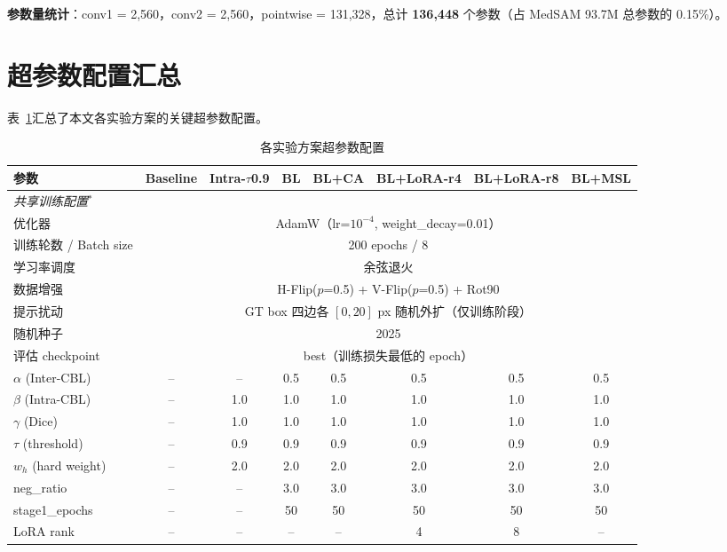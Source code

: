 \textbf{参数量统计}：conv1 = 2,560，conv2 = 2,560，pointwise = 131,328，总计 \textbf{136,448} 个参数（占 MedSAM 93.7M 总参数的 0.15\%）。

\section{超参数配置汇总}

表~\ref{tab:hyperparams}汇总了本文各实验方案的关键超参数配置。

\begin{table}[htbp]
  \centering
  \caption{各实验方案超参数配置}
  \label{tab:hyperparams}
  \footnotesize
  \setlength{\tabcolsep}{2.5pt}
  \begin{tabular}{lccccccc}
    \hline
    参数 & Baseline & Intra-$\tau$0.9 & BL & BL+CA & BL+LoRA-r4 & BL+LoRA-r8 & BL+MSL \\
    \hline
    \multicolumn{8}{l}{\textit{共享训练配置$^*$}} \\
    优化器 & \multicolumn{7}{c}{AdamW（lr=$10^{-4}$, weight\_decay=0.01）} \\
    训练轮数 / Batch size & \multicolumn{7}{c}{200 epochs / 8} \\
    学习率调度 & \multicolumn{7}{c}{余弦退火} \\
    数据增强 & \multicolumn{7}{c}{H-Flip($p$=0.5) + V-Flip($p$=0.5) + Rot90} \\
    提示扰动 & \multicolumn{7}{c}{GT box 四边各 $[0, 20]$ px 随机外扩（仅训练阶段）} \\
    随机种子 & \multicolumn{7}{c}{2025} \\
    评估 checkpoint & \multicolumn{7}{c}{best（训练损失最低的 epoch）} \\
    \hline
    $\alpha$ (Inter-CBL) & -- & -- & 0.5 & 0.5 & 0.5 & 0.5 & 0.5 \\
    $\beta$ (Intra-CBL) & -- & 1.0 & 1.0 & 1.0 & 1.0 & 1.0 & 1.0 \\
    $\gamma$ (Dice) & -- & 1.0 & 1.0 & 1.0 & 1.0 & 1.0 & 1.0 \\
    $\tau$ (threshold) & -- & 0.9 & 0.9 & 0.9 & 0.9 & 0.9 & 0.9 \\
    $w_h$ (hard weight) & -- & 2.0 & 2.0 & 2.0 & 2.0 & 2.0 & 2.0 \\
    neg\_ratio & -- & -- & 3.0 & 3.0 & 3.0 & 3.0 & 3.0 \\
    stage1\_epochs & -- & -- & 50 & 50 & 50 & 50 & 50 \\
    \hline
    LoRA rank & -- & -- & -- & -- & 4 & 8 & -- \\

\end{tabular}
\end{table}
